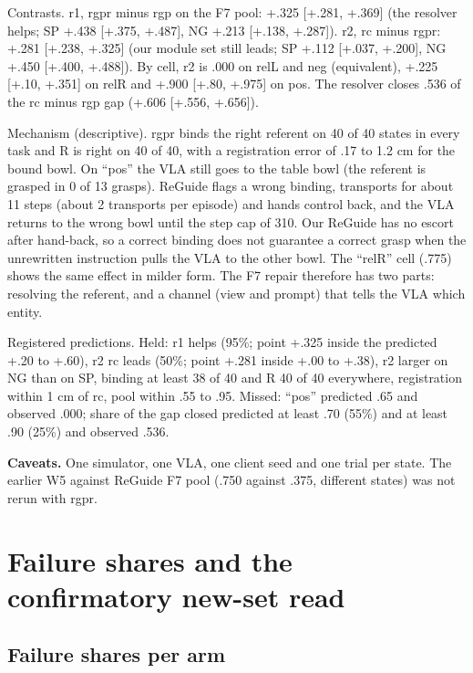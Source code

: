 Contrasts. r1, rgpr minus rgp on the F7 pool: +.325 [+.281, +.369] (the resolver helps; SP +.438 [+.375, +.487], NG +.213 [+.138, +.287]). r2, rc minus rgpr: +.281 [+.238, +.325] (our module set still leads; SP +.112 [+.037, +.200], NG +.450 [+.400, +.488]). By cell, r2 is .000 on relL and neg (equivalent), +.225 [+.10, +.351] on relR and +.900 [+.80, +.975] on pos. The resolver closes .536 of the rc minus rgp gap (+.606 [+.556, +.656]).

Mechanism (descriptive). rgpr binds the right referent on 40 of 40 states in every task and R is right on 40 of 40, with a registration error of .17 to 1.2 cm for the bound bowl. On ``pos'' the VLA still goes to the table bowl (the referent is grasped in 0 of 13 grasps). ReGuide flags a wrong binding, transports for about 11 steps (about 2 transports per episode) and hands control back, and the VLA returns to the wrong bowl until the step cap of 310. Our ReGuide has no escort after hand-back, so a correct binding does not guarantee a correct grasp when the unrewritten instruction pulls the VLA to the other bowl. The ``relR'' cell (.775) shows the same effect in milder form. The F7 repair therefore has two parts: resolving the referent, and a channel (view and prompt) that tells the VLA which entity.

Registered predictions. Held: r1 helps (95\%; point +.325 inside the predicted +.20 to +.60), r2 rc leads (50\%; point +.281 inside +.00 to +.38), r2 larger on NG than on SP, binding at least 38 of 40 and R 40 of 40 everywhere, registration within 1 cm of rc, pool within .55 to .95. Missed: ``pos'' predicted .65 and observed .000; share of the gap closed predicted at least .70 (55\%) and at least .90 (25\%) and observed .536.

\textbf{Caveats.} One simulator, one VLA, one client seed and one trial per state. The earlier W5 against ReGuide F7 pool (.750 against .375, different states) was not rerun with rgpr.

\section{Failure shares and the confirmatory new-set read}
\label{app:M}

\subsection{Failure shares per arm}
\label{app:M1}

